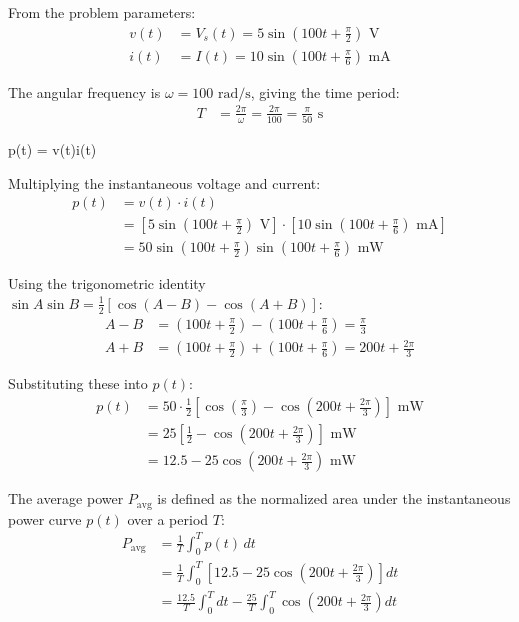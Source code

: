 \begin{enumerate}[label=\thesubsection.\arabic*, ref=\thesubsection.\theenumi]
From the problem parameters:
\begin{align}
v(t) &= V_s(t) = 5 \sin\left(100t + \frac{\pi}{2}\right) \text{ V} \\
i(t) &= I(t) = 10 \sin\left(100t + \frac{\pi}{6}\right) \text{ mA}
\end{align}

The angular frequency is $\omega = 100 \text{ rad/s}$, giving the time period:
\begin{align}
T &= \frac{2\pi}{\omega} = \frac{2\pi}{100} = \frac{\pi}{50} \text{ s}
\end{align}


 p(t) = v(t)i(t)

Multiplying the instantaneous voltage and current:
\begin{align}
p(t) &= v(t) \cdot i(t) \\
&= \left[ 5 \sin\left(100t + \frac{\pi}{2}\right) \text{ V} \right] \cdot \left[ 10 \sin\left(100t + \frac{\pi}{6}\right) \text{ mA} \right] \\
&= 50 \sin\left(100t + \frac{\pi}{2}\right) \sin\left(100t + \frac{\pi}{6}\right) \text{ mW}
\end{align}

Using the trigonometric identity $\sin A \sin B = \frac{1}{2} \left[ \cos(A - B) - \cos(A + B) \right]$:
\begin{align}
A - B &= \left(100t + \frac{\pi}{2}\right) - \left(100t + \frac{\pi}{6}\right) = \frac{\pi}{3} \\
A + B &= \left(100t + \frac{\pi}{2}\right) + \left(100t + \frac{\pi}{6}\right) = 200t + \frac{2\pi}{3}
\end{align}

Substituting these into $p(t)$:
\begin{align}
p(t) &= 50 \cdot \frac{1}{2} \left[ \cos\left(\frac{\pi}{3}\right) - \cos\left(200t + \frac{2\pi}{3}\right) \right] \text{ mW} \\
&= 25 \left[ \frac{1}{2} - \cos\left(200t + \frac{2\pi}{3}\right) \right] \text{ mW} \\
&= 12.5 - 25 \cos\left(200t + \frac{2\pi}{3}\right) \text{ mW}
\end{align}



The average power $P_{\text{avg}}$ is defined as the normalized area under the instantaneous power curve $p(t)$ over a period $T$:
\begin{align}
P_{\text{avg}} &= \frac{1}{T} \int_0^T p(t) \, dt \\
&= \frac{1}{T} \int_0^T \left[ 12.5 - 25 \cos\left(200t + \frac{2\pi}{3}\right) \right] dt \\
&= \frac{12.5}{T} \int_0^T dt - \frac{25}{T} \int_0^T \cos\left(200t + \frac{2\pi}{3}\right) dt
\end{align}


\end{enumerate}
